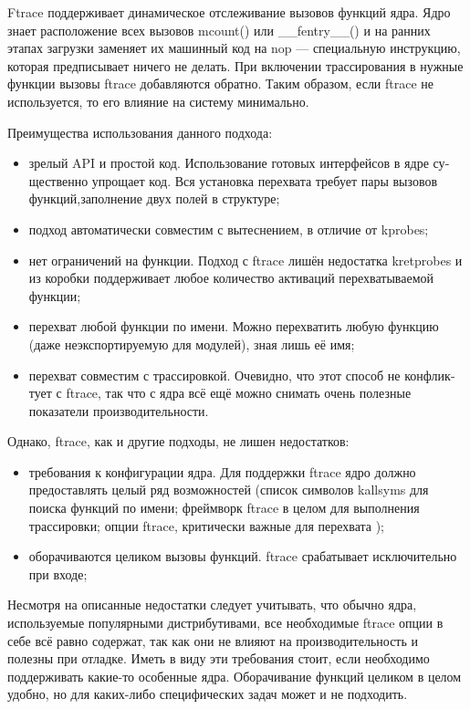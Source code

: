 \documentclass[a4paper,14pt]{article}
\begin{document}
Ftrace поддерживает динамическое отслеживание вызовов функций ядра. Ядро знает расположение всех вызовов mcount() или \_\_fentry\_\_() и на ранних этапах загрузки заменяет их машинный код на nop — специальную инструкцию, которая предписывает ничего не делать. При включении трассирования в нужные функции вызовы ftrace добавляются обратно. Таким образом, если ftrace не используется, то его влияние на систему минимально.

Преимущества использования данного подхода: 

\begin{itemize}
	\item зрелый API и простой код. Использование готовых интерфейсов в ядре су­щественно упрощает код. Вся установка перехвата требует пары вызовов функций,заполнение двух полей в структуре;
	\item подход автоматически совместим с вытеснением, в отличие от kprobes;
	\item нет ограничений на функции. Подход с ftrace лишён недостатка kretprobes и из коробки поддерживает любое количество активаций перехватываемой функции;
	\item перехват любой функции по имени. Можно перехватить любую функцию (даже неэкспортируемую для модулей), зная лишь её имя;
	\item перехват совместим с трассировкой. Очевидно, что этот способ не конфлик­тует с ftrace, так что с ядра всё ещё можно снимать очень полезные показатели производительности.
\end{itemize}

\newpage
Однако, ftrace, как и другие подходы, не лишен недостатков:

\begin{itemize}
	\item требования к конфигурации ядра. Для поддержки ftrace ядро должно предоставлять целый ряд возможностей (список символов kallsyms для поиска функций по имени; фреймворк ftrace в целом для выполнения трассировки; опции ftrace, критически важные для перехвата
	);
	\item оборачиваются целиком вызовы функций. ftrace срабатывает исключительно при входе;
\end{itemize}

Несмотря на описанные недостатки следует учитывать, что обычно ядра, используемые популярными дистрибутивами, все необходимые ftrace опции в себе всё равно содержат, так как они не влияют на производительность и полезны при отладке. Иметь в виду эти требования стоит, если необходимо поддерживать какие-то особенные ядра. Оборачивание функций целиком в целом удобно, но для каких-либо специфических задач может и не подходить.
\end{document}

